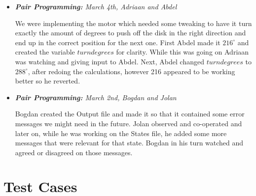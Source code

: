 \begin{itemize}
\item\textit{\textbf{Pair Programming:} March 4th, Adriaan and Abdel}

We were implementing the motor which needed some tweaking to have it turn exactly the amount of degrees to push off the disk in the right direction and end up in the correct position for the next one. First Abdel made it $216^{\circ}$ and created the variable $turndegrees$ for clarity. While this was going on Adriaan was watching and giving input to Abdel. Next, Abdel changed $turndegrees$ to $288^{\circ}$, after redoing the calculations,  however 216 appeared to be working better so he reverted.

\item\textit{\textbf{Pair Programming:} March 2nd, Bogdan and Jolan}

Bogdan created the Output file and made it so that it contained some error messages we might need in the future. Jolan observed and co-operated and later on, while he was working on the States file, he added some more messages that were relevant for that state. Bogdan in his turn watched and agreed or disagreed on those messages.

\end{itemize}




\section{Test Cases} \label{system-validation:test-cases}


